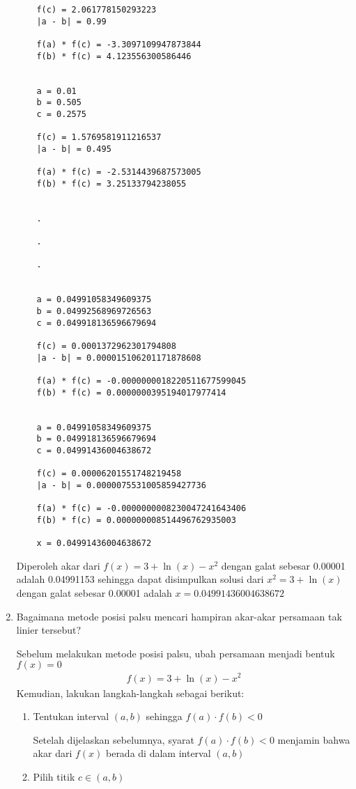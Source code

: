 \documentclass[12pt]{article}
\begin{document}
\begin{enumerate}
{\begin{lstlisting}
    f(c) = 2.061778150293223
    |a - b| = 0.99

    f(a) * f(c) = -3.3097109947873844
    f(b) * f(c) = 4.123556300586446


    a = 0.01
    b = 0.505
    c = 0.2575

    f(c) = 1.5769581911216537
    |a - b| = 0.495

    f(a) * f(c) = -2.5314439687573005
    f(b) * f(c) = 3.25133794238055


    .

    .

    .


    a = 0.04991058349609375
    b = 0.04992568969726563
    c = 0.049918136596679694

    f(c) = 0.0001372962301794808
    |a - b| = 0.000015106201171878608

    f(a) * f(c) = -0.0000000018220511677599045
    f(b) * f(c) = 0.0000000395194017977414


    a = 0.04991058349609375
    b = 0.049918136596679694
    c = 0.04991436004638672

    f(c) = 0.00006201551748219458
    |a - b| = 0.0000075531005859427736

    f(a) * f(c) = -0.0000000008230047241643406
    f(b) * f(c) = 0.000000008514496762935003

    x = 0.04991436004638672
        \end{lstlisting}
        Diperoleh akar dari $ f(x) = 3 + \ln(x) - x^2 $ dengan galat sebesar 0.00001 adalah 0.04991153 sehingga dapat disimpulkan solusi dari $ x^2 = 3 + \ln(x) $ dengan galat sebesar 0.00001 adalah $ x = 0.04991436004638672 $
    } \bigskip
    \item {
        Bagaimana metode posisi palsu mencari hampiran akar-akar persamaan tak linier tersebut?\bigskip

        Sebelum melakukan metode posisi palsu, ubah persamaan menjadi bentuk $ f(x) = 0 $
        \begin{align*}
            f(x) = 3 + \ln(x) -x^2 
        \end{align*}
        Kemudian, lakukan langkah-langkah sebagai berikut:
        \begin{enumerate}
            \item {
                Tentukan interval $ (a,b) $ sehingga $ f(a) \cdot f(b) < 0 $ \bigskip

                Setelah dijelaskan sebelumnya, syarat $ f(a) \cdot f(b) < 0 $ menjamin bahwa akar dari $ f(x) $ berada di dalam interval $ (a,b) $ 
            }
            \item {
                Pilih titik $ c \in (a,b) $\bigskip

}
\end{enumerate}}
\end{enumerate}
\end{document}
